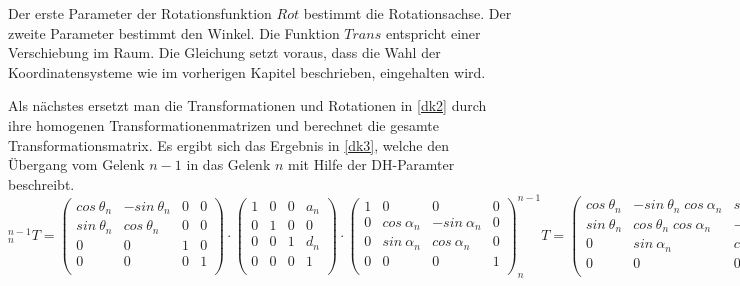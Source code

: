 Der erste Parameter der Rotationsfunktion $Rot$ bestimmt die Rotationsachse. Der zweite Parameter bestimmt den Winkel. Die Funktion $Trans$ entspricht einer Verschiebung im Raum. Die Gleichung setzt voraus, dass die Wahl der Koordinatensysteme wie im vorherigen Kapitel beschrieben, eingehalten wird.

Als nächstes ersetzt man die Transformationen und Rotationen in \autoref{dk2} durch ihre homogenen Transformationenmatrizen und berechnet die gesamte Transformationsmatrix. Es ergibt sich das Ergebnis in \autoref{dk3}, welche den Übergang vom Gelenk $n - 1$ in das Gelenk $n$ mit Hilfe der DH-Paramter beschreibt.
\begin{equation}
  ^{n-1}_{n}T = \begin{pmatrix}
    cos\: \theta_n & -sin\: \theta_n  & 0 & 0\\ 
    sin\: \theta_n & cos\: \theta_n   & 0 & 0\\ 
    0             & 0               & 1 & 0\\ 
    0             & 0               & 0 & 1\\
\end{pmatrix} \cdot
\begin{pmatrix}
  1 & 0 & 0 & a_n\\ 
  0 & 1 & 0 & 0\\ 
  0 & 0 & 1 & d_n\\ 
  0 & 0 & 0 & 1\\
\end{pmatrix} \cdot \begin{pmatrix}
  1 & 0 & 0 & 0\\ 
  0 & cos\: \alpha_n & -sin\: \alpha_n & 0\\ 
  0 & sin\: \alpha_n & cos\: \alpha_n & 0\\ 
  0 & 0 & 0 & 1\\
\end{pmatrix}

^{n-1}_{n}T = \begin{pmatrix}
  cos\: \theta_n  & -sin\: \theta_n\; cos\: \alpha_n    & sin\: \theta_n\; sin\: \alpha_n & a_n\: cos\: \theta_n\\ 
  sin\: \theta_n  & cos\: \theta_n\; cos\: \alpha_n     & -cos\: \theta_n\; sin\: \alpha_n & a_n\: sin\: \theta_n\\ 
  0               & sin\: \alpha_n                & cos\: \alpha_n & d_n\\ 
  0               & 0                             & 0 & 1\\
\end{pmatrix}
\label{dk3}
\end{equation}

